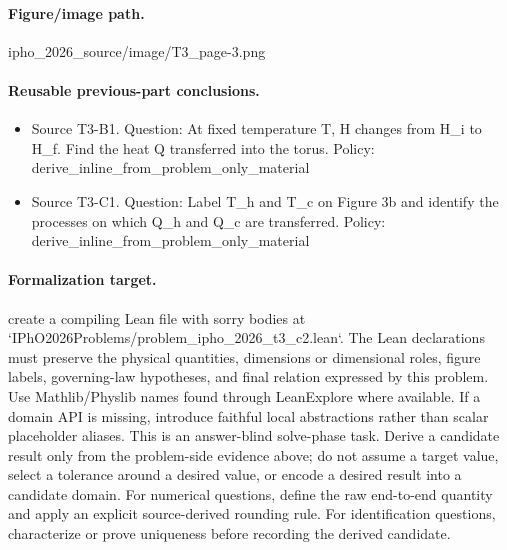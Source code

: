 \paragraph{Figure/image path.}
ipho\_2026\_source/image/T3\_page-3.png

\paragraph{Reusable previous-part conclusions.}
\begin{itemize}
\item Source T3-B1. Question: At fixed temperature T, H changes from H\_i to H\_f. Find the heat Q transferred into the torus. Policy: derive\_inline\_from\_problem\_only\_material
\item Source T3-C1. Question: Label T\_h and T\_c on Figure 3b and identify the processes on which Q\_h and Q\_c are transferred. Policy: derive\_inline\_from\_problem\_only\_material
\end{itemize}

\paragraph{Formalization target.}
create a compiling Lean file with sorry bodies at `IPhO2026Problems/problem\_ipho\_2026\_t3\_c2.lean`.
The Lean declarations must preserve the physical quantities, dimensions or dimensional roles, figure labels, governing-law hypotheses, and final relation expressed by this problem.
Use Mathlib/Physlib names found through LeanExplore where available. If a domain API is missing, introduce faithful local abstractions rather than scalar placeholder aliases.
This is an answer-blind solve-phase task. Derive a candidate result only from the problem-side evidence above; do not assume a target value, select a tolerance around a desired value, or encode a desired result into a candidate domain.
For numerical questions, define the raw end-to-end quantity and apply an explicit source-derived rounding rule. For identification questions, characterize or prove uniqueness before recording the derived candidate.

